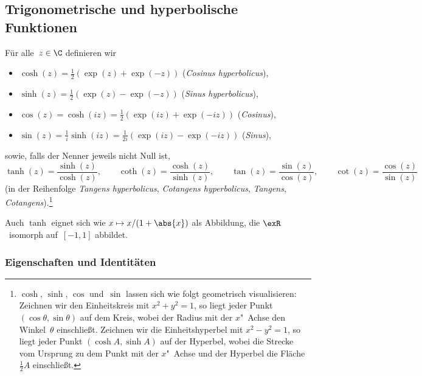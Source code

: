 \documentclass[a4paper]{article}
\begin{document}
\subsection{Trigonometrische und hyperbolische Funktionen}

\begin{definition}
    Für alle~$z \in \C$ definieren wir
    \begin{itemize}
        \item $\cosh(z) = \frac{1}{2}(\exp(z)+\exp(-z))$ (\emph{Cosinus hyperbolicus}),
        \item $\sinh(z) = \frac{1}{2}(\exp(z)-\exp(-z))$ (\emph{Sinus hyperbolicus}),
        \item $\cos(z) = \cosh(iz) = \frac{1}{2}(\exp(iz)+\exp(-iz))$ (\emph{Cosinus}),
        \item $\sin(z) = \frac{1}{i}\sinh(iz) = \frac{1}{2i}(\exp(iz)-\exp(-iz))$ (\emph{Sinus}),
    \end{itemize}
    sowie, falls der Nenner jeweils nicht Null ist,
    \begin{equation*}
        \tanh(z) = \frac{\sinh(z)}{\cosh(z)}, \qquad \coth(z) = \frac{\cosh(z)}{\sinh(z)}, \qquad \tan(z) = \frac{\sin(z)}{\cos(z)}, \qquad \cot(z) = \frac{\cos(z)}{\sin(z)}
    \end{equation*}
    (in der Reihenfolge \emph{Tangens hyperbolicus}, \emph{Cotangens hyperbolicus}, \emph{Tangens}, \emph{Cotangens}).\footnote{$\cosh$, $\sinh$, $\cos$ und~$\sin$ lassen sich wie folgt geometrisch visualisieren: Zeichnen wir den Einheitskreis mit $x^2+y^2 = 1$, so liegt jeder Punkt $(\cos\theta,\sin\theta)$ auf dem Kreis, wobei der Radius mit der $x$"~Achse den Winkel~$\theta$ einschließt. Zeichnen wir die Einheitshyperbel mit $x^2-y^2 = 1$, so liegt jeder Punkt $(\cosh A,\sinh A)$ auf der Hyperbel, wobei die Strecke vom Ursprung zu dem Punkt mit der $x$"~Achse und der Hyperbel die Fläche $\frac{1}{2}A$ einschließt.}
\end{definition}

Auch $\tanh$ eignet sich wie $x \mapsto x/(1+\abs{x})$ als Abbildung, die $\exR$~isomorph auf~$[-1,1]$ abbildet.

\subsubsection{Eigenschaften und Identitäten}
\end{document}
